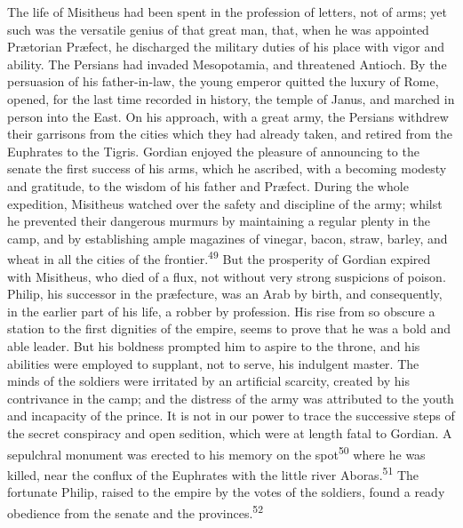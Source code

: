 The life of Misitheus had been spent in the profession of
letters, not of arms; yet such was the versatile genius of that
great man, that, when he was appointed Prætorian Præfect, he
discharged the military duties of his place with vigor and
ability. The Persians had invaded Mesopotamia, and threatened
Antioch. By the persuasion of his father-in-law, the young
emperor quitted the luxury of Rome, opened, for the last time
recorded in history, the temple of Janus, and marched in person
into the East. On his approach, with a great army, the Persians
withdrew their garrisons from the cities which they had already
taken, and retired from the Euphrates to the Tigris. Gordian
enjoyed the pleasure of announcing to the senate the first
success of his arms, which he ascribed, with a becoming modesty
and gratitude, to the wisdom of his father and Præfect. During
the whole expedition, Misitheus watched over the safety and
discipline of the army; whilst he prevented their dangerous
murmurs by maintaining a regular plenty in the camp, and by
establishing ample magazines of vinegar, bacon, straw, barley,
and wheat in all the cities of the frontier.\textsuperscript{49} But the
prosperity of Gordian expired with Misitheus, who died of a flux,
not without very strong suspicions of poison. Philip, his
successor in the præfecture, was an Arab by birth, and
consequently, in the earlier part of his life, a robber by
profession. His rise from so obscure a station to the first
dignities of the empire, seems to prove that he was a bold and
able leader. But his boldness prompted him to aspire to the
throne, and his abilities were employed to supplant, not to
serve, his indulgent master. The minds of the soldiers were
irritated by an artificial scarcity, created by his contrivance
in the camp; and the distress of the army was attributed to the
youth and incapacity of the prince. It is not in our power to
trace the successive steps of the secret conspiracy and open
sedition, which were at length fatal to Gordian. A sepulchral
monument was erected to his memory on the spot\textsuperscript{50} where he was
killed, near the conflux of the Euphrates with the little river
Aboras.\textsuperscript{51} The fortunate Philip, raised to the empire by the
votes of the soldiers, found a ready obedience from the senate
and the provinces.\textsuperscript{52}



